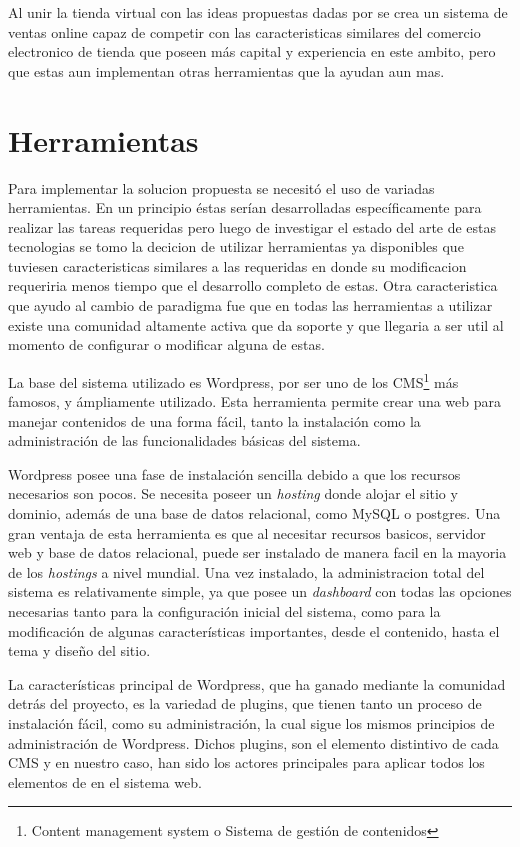 Al unir la tienda virtual con las ideas propuestas dadas por {\GAM} se crea un
sistema de ventas online capaz de competir con las caracteristicas similares del 
comercio electronico de tienda que poseen más capital y experiencia en este ambito, pero
que estas aun implementan otras herramientas que la ayudan aun mas.

\section{Herramientas}

Para implementar la solucion propuesta se necesitó el uso de variadas herramientas.
En un principio éstas serían desarrolladas específicamente para realizar las
tareas requeridas pero luego de investigar el estado del arte de estas tecnologias
se tomo la decicion de utilizar herramientas ya disponibles que tuviesen caracteristicas 
similares a las requeridas en donde su modificacion requeriria menos tiempo que el desarrollo
completo de estas. Otra caracteristica que ayudo al cambio de paradigma fue que en todas 
las herramientas a utilizar existe una comunidad altamente activa que da soporte y que 
llegaria a ser util al momento de configurar o modificar alguna de estas.

La base del sistema utilizado es Wordpress,
por ser uno de los CMS\footnote{Content management system o Sistema de gestión de contenidos}
 más famosos, y ámpliamente utilizado.
Esta herramienta permite crear una web para manejar contenidos
de una forma fácil, tanto la instalación como la administración de las
funcionalidades básicas del sistema.

Wordpress posee una fase de instalación sencilla debido a que los recursos
necesarios son pocos. Se necesita poseer un \emph{hosting} donde alojar el sitio y dominio,
además de una base de datos relacional, como MySQL o postgres. Una gran ventaja de esta
herramienta es que al necesitar recursos basicos, servidor web y base de datos relacional, 
puede ser instalado de manera facil en la mayoria de los \emph{hostings} a nivel mundial. 
Una vez instalado, la administracion total del sistema es relativamente simple,
ya que posee un \emph{dashboard} con todas las opciones necesarias
tanto para la configuración inicial del sistema, como para la modificación
de algunas características importantes, desde el contenido, hasta el tema
y diseño del sitio.

La características principal de Wordpress, que ha ganado mediante
la comunidad detrás del proyecto, es la variedad de plugins, que
tienen tanto un proceso de instalación fácil, como su administración,
la cual sigue los mismos principios de administración de Wordpress.
Dichos plugins, son el elemento distintivo de cada CMS
y en nuestro caso, han sido los actores principales para aplicar
todos los elementos de {\GAM} en el sistema web.

